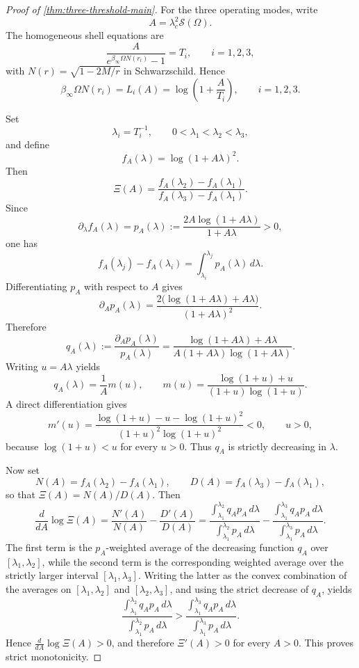 \begin{proof}[Proof of \cref{thm:three-threshold-main}]
For the three operating modes, write
\[
A=\lambda_c^2\mathcal S(\Omega).
\]
The homogeneous shell equations are
\begin{equation}\label{eq:appendix-three-shell}
\frac{A}{e^{\beta_\infty\Omega N(r_i)}-1}=T_i,
\qquad i=1,2,3,
\end{equation}
with $N(r)=\sqrt{1-2M/r}$ in Schwarzschild. Hence
\begin{equation}\label{eq:appendix-three-log}
\beta_\infty\Omega N(r_i)=L_i(A)=\log\!\left(1+\frac{A}{T_i}\right),
\qquad i=1,2,3.
\end{equation}

Set
\[
\lambda_i=T_i^{-1},
\qquad
0<\lambda_1<\lambda_2<\lambda_3,
\]
and define
\[
f_A(\lambda)=\log(1+A\lambda)^2.
\]
Then
\[
\Xi(A)=
\frac{f_A(\lambda_2)-f_A(\lambda_1)}
     {f_A(\lambda_3)-f_A(\lambda_1)}.
\]
Since
\[
\partial_\lambda f_A(\lambda)
=
p_A(\lambda)
:=
\frac{2A\log(1+A\lambda)}{1+A\lambda}
>0,
\]
one has
\[
f_A(\lambda_j)-f_A(\lambda_i)=\int_{\lambda_i}^{\lambda_j}p_A(\lambda)\,d\lambda.
\]
Differentiating $p_A$ with respect to $A$ gives
\[
\partial_A p_A(\lambda)
=
\frac{2\bigl(\log(1+A\lambda)+A\lambda\bigr)}{(1+A\lambda)^2}.
\]
Therefore
\[
q_A(\lambda)
:=
\frac{\partial_A p_A(\lambda)}{p_A(\lambda)}
=
\frac{\log(1+A\lambda)+A\lambda}{A(1+A\lambda)\log(1+A\lambda)}.
\]
Writing $u=A\lambda$ yields
\[
q_A(\lambda)=\frac{1}{A}m(u),
\qquad
m(u)=\frac{\log(1+u)+u}{(1+u)\log(1+u)}.
\]
A direct differentiation gives
\[
m'(u)=
\frac{\log(1+u)-u-\log(1+u)^2}
{(1+u)^2\log(1+u)^2}
<0,
\qquad u>0,
\]
because $\log(1+u)<u$ for every $u>0$. Thus $q_A$ is strictly decreasing in $\lambda$.

Now set
\[
N(A)=f_A(\lambda_2)-f_A(\lambda_1),
\qquad
D(A)=f_A(\lambda_3)-f_A(\lambda_1),
\]
so that $\Xi(A)=N(A)/D(A)$. Then
\[
\frac{d}{dA}\log\Xi(A)
=
\frac{N'(A)}{N(A)}-\frac{D'(A)}{D(A)}
=
\frac{\int_{\lambda_1}^{\lambda_2}q_Ap_A\,d\lambda}
     {\int_{\lambda_1}^{\lambda_2}p_A\,d\lambda}
-
\frac{\int_{\lambda_1}^{\lambda_3}q_Ap_A\,d\lambda}
     {\int_{\lambda_1}^{\lambda_3}p_A\,d\lambda}.
\]
The first term is the $p_A$-weighted average of the decreasing function $q_A$ over $[\lambda_1,\lambda_2]$, while the second term is the corresponding weighted average over the strictly larger interval $[\lambda_1,\lambda_3]$. Writing the latter as the convex combination of the averages on $[\lambda_1,\lambda_2]$ and $[\lambda_2,\lambda_3]$, and using the strict decrease of $q_A$, yields
\[
\frac{\int_{\lambda_1}^{\lambda_2}q_Ap_A\,d\lambda}
     {\int_{\lambda_1}^{\lambda_2}p_A\,d\lambda}
>
\frac{\int_{\lambda_1}^{\lambda_3}q_Ap_A\,d\lambda}
     {\int_{\lambda_1}^{\lambda_3}p_A\,d\lambda}.
\]
Hence $\frac{d}{dA}\log\Xi(A)>0$, and therefore $\Xi'(A)>0$ for every $A>0$. This proves strict monotonicity.


\end{proof}
